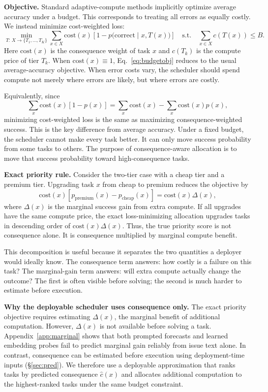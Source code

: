 \documentclass{article}
\begin{document}
\textbf{Objective.}
Standard adaptive-compute methods implicitly optimize average accuracy
under a budget. This corresponds to treating all errors as equally
costly. We instead minimize cost-weighted loss:
\begin{equation}
\label{eq:budgetobj}
\min_{T:\,X\to\{T_1,\dots,T_K\}}
\sum_{x\in X}
\mathrm{cost}(x)
\left[
1-p\bigl(\mathrm{correct}\mid x,T(x)\bigr)
\right]
\quad
\mathrm{s.t.}
\quad
\sum_{x\in X} c(T(x)) \le B .
\end{equation}
Here $\mathrm{cost}(x)$ is the consequence weight of task $x$ and
$c(T_k)$ is the compute price of tier $T_k$. When
$\mathrm{cost}(x)\equiv 1$, Eq.~\ref{eq:budgetobj} reduces to the
usual average-accuracy objective. When error costs vary, the scheduler
should spend compute not merely where errors are likely, but where
errors are costly.

Equivalently, since
\[
\sum_x \mathrm{cost}(x)[1-p(x)]
=
\sum_x \mathrm{cost}(x)
-
\sum_x \mathrm{cost}(x)p(x),
\]
minimizing cost-weighted loss is the same as maximizing
consequence-weighted success. This is the key difference from average
accuracy. Under a fixed budget, the scheduler cannot make every task
better. It can only move success probability from some tasks to others.
The purpose of consequence-aware allocation is to move that success
probability toward high-consequence tasks.

\textbf{Exact priority rule.}
Consider the two-tier case with a cheap tier and a premium tier.
Upgrading task $x$ from cheap to premium reduces the objective by
\[
\mathrm{cost}(x)
\left[
p_{\mathrm{premium}}(x)-p_{\mathrm{cheap}}(x)
\right]
=
\mathrm{cost}(x)\Delta(x),
\]
where $\Delta(x)$ is the marginal success gain from extra compute. If
all upgrades have the same compute price, the exact loss-minimizing
allocation upgrades tasks in descending order of
$\mathrm{cost}(x)\Delta(x)$. Thus, the true priority score is not
consequence alone. It is consequence multiplied by marginal compute
benefit.

This decomposition is useful because it separates the two quantities a
deployer would ideally know. The consequence term answers: how costly
is a failure on this task? The marginal-gain term answers: will extra
compute actually change the outcome? The first is often visible before
solving; the second is much harder to estimate before execution.

\textbf{Why the deployable scheduler uses consequence only.}
The exact priority objective requires estimating $\Delta(x)$, the
marginal benefit of additional computation. However, $\Delta(x)$ is
not available before solving a task. Appendix~\ref{app:marginal} shows
that both prompted forecasts and learned embedding probes fail to
predict marginal gain reliably from issue text alone. In contrast,
consequence can be estimated before execution using deployment-time
inputs (\S\ref{sec:pred}). We therefore use a deployable approximation
that ranks tasks by predicted consequence $\hat{c}(x)$ and allocates
additional computation to the highest-ranked tasks under the same
budget constraint.
\end{document}
